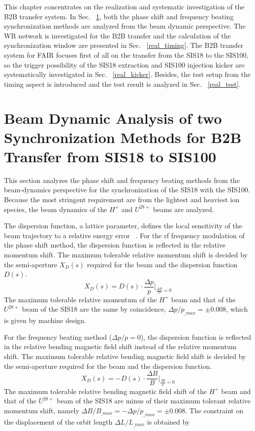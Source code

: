 

This chapter concentrates on the realization and systematic investigation of the \gls{B2B} transfer system. In Sec. ~\ref{real_dyn}, both the phase shift and frequency beating synchronization methods are analyzed from the beam dynamic perspective. The WR network is investigated for the B2B transfer and the calculation of the synchronization window are presented in Sec. ~\ref{real_timing}. The B2B transfer system for FAIR focuses first of all on the transfer from the SIS18 to the SIS100, so the trigger possibility of the SIS18 extraction and SIS100 injection kicker are systematically investigated in Sec. ~\ref{real_kicker}. Besides, the test setup from the timing aspect is introduced and the test result is analyzed in Sec. ~\ref{real_test}. 

\section{Beam Dynamic Analysis of two Synchronization Methods for B2B Transfer from SIS18 to SIS100}
\label{real_dyn}
This section analyzes the phase shift and frequency beating methods from the beam-dynamics perspective for the synchronization of the SIS18 with the SIS100. Because the most stringent requirement are from the lightest and heaviest ion species, the beam dynamics of the $H^+$ and $U^\mathit{28+}$ beams are analyzed.

The dispersion function, a lattice parameter, defines the local sensitivity of the beam trajectory to a relative energy error ~\cite{lee_accelerator_2011}. For the rf frequency modulation of the phase shift method, the dispersion function is reflected in the relative momentum shift. The maximum tolerable relative momentum shift is decided by the semi-aperture $X_D(s)$ required for the beam and the dispersion function $D(s)$.
\begin{equation}
		X_D(s)=D(s)\cdot \frac{\Delta p}{p}|_\mathit{\frac{\Delta B}{B}=0}
\end{equation}
The maximum tolerable relative momentum of the $H^{+}$ beam and that of the $U^\mathit{28+}$ beam of the SIS18 are the same by coincidence, $\Delta p/p_\mathit{\_max}=\pm0.008$, which is given by machine design. 

For the frequency beating method ($\Delta p/p=0$), the dispersion function is reflected in the relative bending magnetic field shift instead of the relative momentum shift. The maximum tolerable relative bending magnetic field shift is decided by the semi-aperture required for the beam and the dispersion function. 
\begin{equation}
		X_D(s)=-D(s)\cdot \frac{\Delta B}{B}|_\mathit{\frac{\Delta p}{p}=0}
\end{equation}
The maximum tolerable relative bending magnetic field shift of the $H^{+}$ beam and that of the $U^\mathit{28+}$ beam of the SIS18 are minus of their maximum tolerant relative momentum shift, namely $\Delta B/B_\mathit{\_max}=-\Delta p/p_\mathit{\_max}=\pm0.008$. The constraint on the displacement of the orbit length $\Delta L/L_\mathit{\_max}$ is obtained by 


